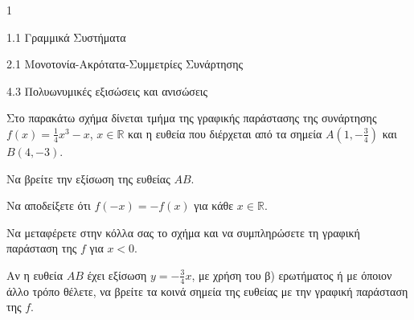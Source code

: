 \begin{ylh}{1}
\item 1.1 Γραμμικά Συστήματα
\item 2.1 Μονοτονία-Ακρότατα-Συμμετρίες Συνάρτησης
\item 4.3 Πολυωνυμικές εξισώσεις και ανισώσεις
\end{ylh}
Στο παρακάτω σχήμα δίνεται τμήμα της γραφικής παράστασης της συνάρτησης $f(x) = \frac{1}{4}x^3 - x$, $x \in \mathbb{R}$ και η ευθεία που διέρχεται από τα σημεία $A\left(1, -\frac{3}{4}\right)$ και $B(4, -3)$.
\begin{center}
\end{center}
\begin{alist}
\item Να βρείτε την εξίσωση της ευθείας $AB$. 
\item \begin{rlist}
\item Να αποδείξετε ότι $f(-x) = -f(x)$ για κάθε $x \in \mathbb{R}$. 
\item Να μεταφέρετε στην κόλλα σας το σχήμα και να συμπληρώσετε τη γραφική παράσταση της $f$ για $x < 0$. 
\end{rlist}
\item Αν η ευθεία $AB$ έχει εξίσωση $y = -\frac{3}{4}x$, με χρήση του β) ερωτήματος ή με όποιον άλλο τρόπο θέλετε, να βρείτε τα κοινά σημεία της ευθείας με την γραφική παράσταση της $f$. 
\end{alist}

